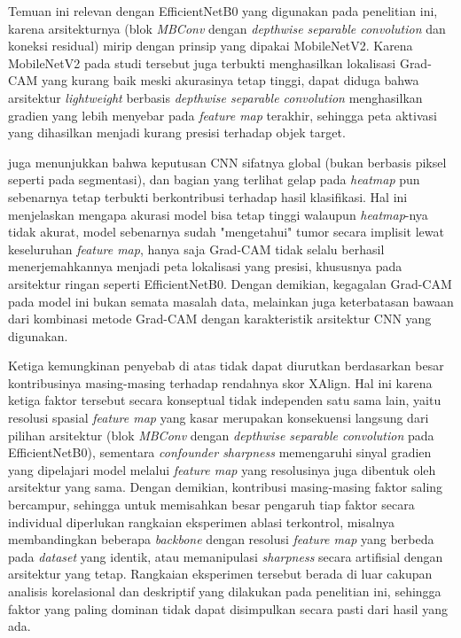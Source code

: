 \begin{enumerate}
	Temuan ini relevan dengan EfficientNetB0 yang digunakan pada penelitian ini, karena arsitekturnya (blok \textit{MBConv} dengan \textit{depthwise separable convolution} dan koneksi residual) mirip dengan prinsip yang dipakai MobileNetV2. Karena MobileNetV2 pada studi tersebut juga terbukti menghasilkan lokalisasi Grad-CAM yang kurang baik meski akurasinya tetap tinggi, dapat diduga bahwa arsitektur \textit{lightweight} berbasis \textit{depthwise separable convolution} menghasilkan gradien yang lebih menyebar pada \textit{feature map} terakhir, sehingga peta aktivasi yang dihasilkan menjadi kurang presisi terhadap objek target.
	
	\textcite{guan2022sneak} juga menunjukkan bahwa keputusan CNN sifatnya global (bukan berbasis piksel seperti pada segmentasi), dan bagian yang terlihat gelap pada \textit{heatmap} pun sebenarnya tetap terbukti berkontribusi terhadap hasil klasifikasi. Hal ini menjelaskan mengapa akurasi model bisa tetap tinggi walaupun \textit{heatmap}-nya tidak akurat, model sebenarnya sudah "mengetahui" tumor secara implisit lewat keseluruhan \textit{feature map}, hanya saja Grad-CAM tidak selalu berhasil menerjemahkannya menjadi peta lokalisasi yang presisi, khususnya pada arsitektur ringan seperti EfficientNetB0. Dengan demikian, kegagalan Grad-CAM pada model ini bukan semata masalah data, melainkan juga keterbatasan bawaan dari kombinasi metode Grad-CAM dengan karakteristik arsitektur CNN yang digunakan.
\end{enumerate}

Ketiga kemungkinan penyebab di atas tidak dapat diurutkan berdasarkan besar kontribusinya masing-masing terhadap rendahnya skor XAlign. Hal ini karena ketiga faktor tersebut secara konseptual tidak independen satu sama lain, yaitu resolusi spasial \textit{feature map} yang kasar merupakan konsekuensi langsung dari pilihan arsitektur (blok \textit{MBConv} dengan \textit{depthwise separable convolution} pada EfficientNetB0), sementara \textit{confounder sharpness} memengaruhi sinyal gradien yang dipelajari model melalui \textit{feature map} yang resolusinya juga dibentuk oleh arsitektur yang sama. Dengan demikian, kontribusi masing-masing faktor saling bercampur, sehingga untuk memisahkan besar pengaruh tiap faktor secara individual diperlukan rangkaian eksperimen ablasi terkontrol, misalnya membandingkan beberapa \textit{backbone} dengan resolusi \textit{feature map} yang berbeda pada \textit{dataset} yang identik, atau memanipulasi \textit{sharpness} secara artifisial dengan arsitektur yang tetap. Rangkaian eksperimen tersebut berada di luar cakupan analisis korelasional dan deskriptif yang dilakukan pada penelitian ini, sehingga faktor yang paling dominan tidak dapat disimpulkan secara pasti dari hasil yang ada.